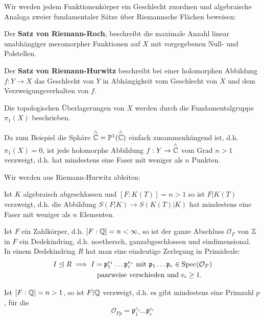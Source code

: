 \begin{bemerkungnr}
    Wir werden jedem Funktionenkörper ein Geschlecht zuordnen und algebraische Analoga zweier fundamentaler Sätze über
    Riemannsche Flächen beweisen:

    Der \textbf{Satz von Riemann-Roch}, beschreibt die maximale Anzahl linear unabhängiger meromorpher Funktionen auf $X$
    mit vorgegebenen Null- und Polstellen.

    Der \textbf{Satz von Riemann-Hurwitz} beschreibt bei einer holomorphen Abbildung $f: Y \to X$ das Geschlecht von $Y$ in
    Abhängigkeit vom Geschlecht von $X$ und dem Verzweigungsverhalten von $f$.
\end{bemerkungnr}

\begin{bemerkungnr}
    Die topologischen Überlagerungen von $X$ werden durch die Fundamentalgruppe $\pi_1(X)$ beschrieben.

    Da zum Beispiel die Sphäre $\overset{\wedge}{\mathbb{C}} = \mathbb{P}^1(\overset{\wedge}{\mathbb{C}})$ einfach zusammenhängend ist,
    d.h. $\pi_1(X) = 0$, ist jede holomorphe Abbildung $f: Y \to \overset{\wedge}{\mathbb{C}}$ vom Grad $n > 1$ verzweigt,
    d.h. hat mindestens eine Faser mit weniger als $n$ Punkten.
\end{bemerkungnr}

Wir werden aus Riemann-Hurwitz ableiten:
\begin{theorem}
    Ist $K$ algebraisch abgeschlossen und $[F:K(T)] = n > 1$ so ist $F|K(T)$ verzweigt, d.h. die Abbildung
    $S(F|K) \to S(K(T)|K)$ hat mindestens eine Faser mit weniger als $n$ Elementen.    
\end{theorem}

\begin{bemerkungnr}
    Ist $F$ ein Zahlkörper, d.h. $[F:\mathbb{Q}] = n < \infty$, so ist der ganze Abschluss $\mathcal{O}_F$ von $\mathbb{Z}$ in $F$ ein Dedekindring,
    d.h. noethersch, ganzabgeschlossen und eindimensional.\\
    In einem Dedekindring $R$ hat man eine eindeutige Zerlegung in Primideale:
    \begin{align*}
        I \trianglelefteq R \implies I &= \mathfrak{p}_1^{e_1} \ldots \mathfrak{p}_r^{e_r} \text{ mit } \mathfrak{p}_1 \ldots \mathfrak{p}_r \in \operatorname{Spec}(\mathcal{O}_F)\\
        &  \text{ paarweise verschieden und } e_i \geq 1. 
    \end{align*}
\end{bemerkungnr}

\begin{theorem}[Minkowski 1910]
    Ist $[F:\mathbb{Q}] = n > 1$, so ist $F|\mathbb{Q}$ verzweigt, d.h. es gibt mindestens eine Primzahl $p$, für die
    $$ \mathcal{O}_{Fp} = \mathfrak{p}_1^{e_1} \ldots \mathfrak{p}_r^{e_r}$$
\end{theorem}

